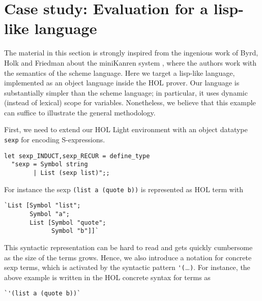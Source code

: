 

\section{Case study: Evaluation for a lisp-like language}
\label{sec:lisp-eval}

The material in this section is strongly inspired from the ingenious
work of Byrd, Holk and Friedman about the miniKanren system
\cite{Byrd:2012:MLU:2661103.2661105}, where the authors work with the
semantics of the scheme language.  Here we target a lisp-like
language, implemented as an object language inside the HOL prover.
Our language is substantially simpler than the scheme language; in
particular, it uses dynamic (instead of lexical) scope for variables.
Nonetheless, we believe that this example can suffice to illustrate
the general methodology.

First, we need to extend our HOL Light environment with an object
datatype \verb|sexp| for encoding S-expressions.
\begin{verbatim}
let sexp_INDUCT,sexp_RECUR = define_type
  "sexp = Symbol string
        | List (sexp list)";;
\end{verbatim}
For instance the sexp \verb|(list a (quote b))| is represented as HOL
term with
\begin{verbatim}
`List [Symbol "list";
       Symbol "a";
       List [Symbol "quote";
             Symbol "b"]]`
\end{verbatim}
This syntactic representation can be hard to read and gets quickly
cumbersome as the size of the terms grows.  Hence, we also introduce a
notation for concrete sexp terms, which is activated by the syntactic
pattern \verb|'(|\ldots\verb|)|.  For instance, the above example
is written in the HOL concrete syntax for terms as
\begin{verbatim}
`'(list a (quote b))`
\end{verbatim}

